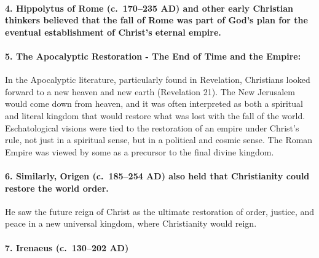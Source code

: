 \paragraph{4.
Hippolytus of Rome (c.~170--235 AD) and other early Christian thinkers believed that the fall of Rome was part of God's plan for the eventual establishment of Christ's eternal empire.}\label{par:hippolytus-of-rome-c.-170235-ad-and-other-early-christian-thinkers-believed-that-the-fall-of-rome-was-part-of-gods-plan-for-the-eventual-establishment-of-christs-eternal-empire.}

\paragraph{5.
The Apocalyptic Restoration - The End of Time and the Empire:}\label{par:the-apocalyptic-restoration---the-end-of-time-and-the-empire}

In the Apocalyptic literature, particularly found in Revelation, Christians looked forward to a new heaven and new earth (Revelation 21).
The New Jerusalem would come down from heaven, and it was often interpreted as both a spiritual and literal kingdom that would restore what was lost with the fall of the world.
Eschatological visions were tied to the restoration of an empire under Christ's rule, not just in a spiritual sense, but in a political and cosmic sense.
The Roman Empire was viewed by some as a precursor to the final divine kingdom.

\paragraph{6.
Similarly, Origen (c.~185--254 AD) also held that Christianity could restore the world order.}\label{par:similarly-origen-c.-185254-ad-also-held-that-christianity-could-restore-the-world-order.-he-saw-the-future-reign-of-christ-as-the-ultimate-restoration-of-order-justice-and-peace-in-a-new-universal-kingdom-where-christianity-would-reign.}

He saw the future reign of Christ as the ultimate restoration of order, justice, and peace in a new universal kingdom, where Christianity would reign.

\paragraph{7.
Irenaeus (c.~130--202 AD)}\label{par:irenaeus-c.-130202-ad---in-his-work-against-heresies-irenaeus-speaks-about-the-role-of-the-roman-empire-in-gods-providence-and-the-eventual-victory-of-christianity.-he-hints-at-a-future-unity-and-a-cosmic-victory-which-could-be-seen-as-the-restoration-of-the-world-through-christs-reign.}

